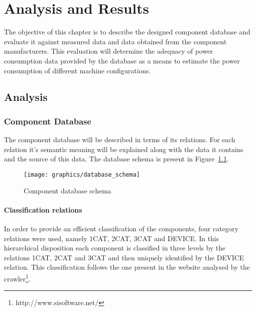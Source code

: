 

\chapter{Analysis and Results} \label{chap4:analysis_results}
%
    The objective of this chapter is to describe the designed component database and evaluate it against measured data and data obtained from the component manufacturers. This evaluation will determine the adequacy of power consumption data provided by the database as a means to estimate the power consumption of different machine configurations.
\section{Analysis} \label{sec4:analysis}
\subsection{Component Database} \label{sec4:component_database}
    The component database will be described in terms of its relations. For each relation it's semantic meaning will be explained along with the data it contains and the source of this data. The database schema is present in Figure~\ref{fig:database_schema}.

    \begin{figure}[h!tb]
        \centering
        \texttt{[image: graphics/database\_schema]}
        \caption{Component database schema}
        \label{fig:database_schema}
    \end{figure}

    \subsubsection*{Classification relations}
        In order to provide an efficient classification of the components, four category relations were used, namely 1CAT, 2CAT, 3CAT and DEVICE. In this hierarchical disposition each component is classified in three levels by the relations 1CAT, 2CAT and 3CAT and then uniquely identified by the DEVICE relation. This classification follows the one present in the website analysed by the crawler\footnote{http://www.sisoftware.net/}.

